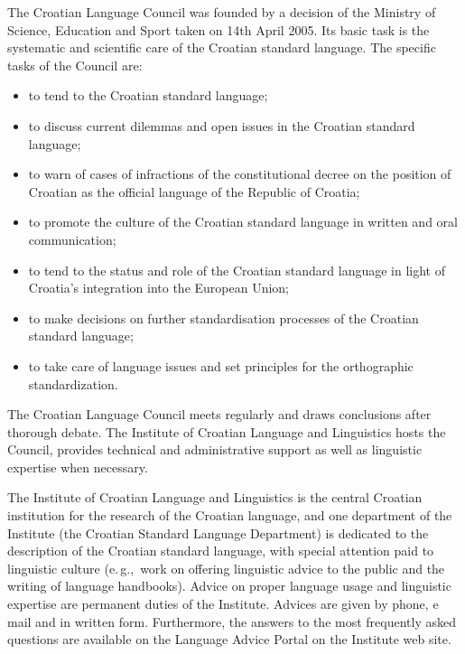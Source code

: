 \begin{multicols}{2}
The Croatian Language Council was founded by a decision of the Ministry of Science, Education and Sport taken on 14th April 2005. Its basic task is the systematic and scientific care of the Croatian standard language. The specific tasks of the Council are:

\begin{itemize}
\item to tend to the Croatian standard language;
\item to discuss current dilemmas and open issues in the Croatian standard language;
\item to warn of cases of infractions of the constitutional decree on the position of Croatian as the official language of the Republic of Croatia;
\item to promote the culture of the Croatian standard language in written and oral communication;
\item to tend to the status and role of the Croatian standard language in light of Croatia’s integration into the European Union;
\item to make decisions on further standardisation processes of the Croatian standard language;
\item to take care of language issues and set principles for the orthographic standardization.
\end{itemize}

The Croatian Language Council meets regularly and draws conclusions after thorough debate. The Institute of Croatian Language and Linguistics hosts the Council, provides technical and administrative support as well as linguistic expertise when necessary.

The Institute of Croatian Language and Linguistics \cite{str7} is the central Croatian institution for the research of the Croatian language, and one department of the Institute (the Croatian Standard Language Department) is dedicated to the description of the Croatian standard language, with special attention paid to linguistic culture (e.\,g.,~work on offering linguistic advice to the public and the writing of language handbooks). Advice on proper language usage and linguistic expertise are permanent duties of the Institute. Advices are given by phone, e mail and in written form. Furthermore, the answers to the most frequently asked questions are available on the Language Advice Portal \cite{str8} on the Institute web site.



\end{multicols}
